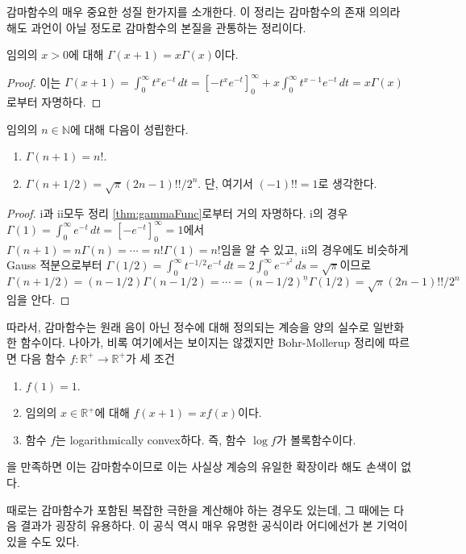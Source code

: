 감마함수의 매우 중요한 성질 한가지를 소개한다. 이 정리는 감마함수의 존재 의의라 해도 과언이 아닐 정도로 감마함수의 본질을 관통하는 정리이다.

\begin{theorem}\label{thm:gammaFunc}
    임의의 $x>0$에 대해 $\Gamma(x+1)=x\Gamma(x)$이다.
\end{theorem}

\begin{proof}
    이는 $\Gamma(x+1)=\int_0^\infty t^xe^{-t}\,dt=[-t^xe^{-t}]_0^\infty+x\int_0^\infty t^{x-1}e^{-t}\,dt=x\Gamma(x)$로부터 자명하다.
\end{proof}

\begin{corollary}
    임의의 $n\in\mathbb{N}$에 대해 다음이 성립한다.
    \begin{enumerate}
        \item $\Gamma(n+1)=n!$.
        \item $\Gamma(n+1/2)=\sqrt{\pi}(2n-1)!!/2^n$. 단, 여기서 $(-1)!!=1$로 생각한다.
    \end{enumerate}
\end{corollary}

\begin{proof}
    i과 ii모두 정리 \ref{thm:gammaFunc}로부터 거의 자명하다. i의 경우 $\Gamma(1)=\int_0^\infty e^{-t}\,dt=[-e^{-t}]_0^\infty=1$에서 $\Gamma(n+1)=n\Gamma(n)=\cdots=n!\Gamma(1)=n!$임을 알 수 있고, ii의 경우에도 비슷하게 Gauss 적분으로부터 $\Gamma(1/2)=\int_0^\infty t^{-1/2}e^{-t}\,dt=2\int_0^\infty e^{-s^2}\,ds=\sqrt{\pi}$이므로 $\Gamma(n+1/2)=(n-1/2)\Gamma(n-1/2)=\cdots=(n-1/2)^{\underline{n}}\Gamma(1/2)=\sqrt{\pi}(2n-1)!!/2^n$임을 안다.
\end{proof}

따라서, 감마함수는 원래 음이 아닌 정수에 대해 정의되는 계승을 양의 실수로 일반화한 함수이다. 나아가, 비록 여기에서는 보이지는 않겠지만 Bohr-Mollerup 정리에 따르면 다음 함수 $f:\mathbb{R}^+\to\mathbb{R}^+$가 세 조건
\begin{enumerate}
    \item $f(1)=1$.
    \item 임의의 $x\in\mathbb{R}^+$에 대해 $f(x+1)=xf(x)$이다.
    \item 함수 $f$는 logarithmically convex하다. 즉, 함수 $\log f$가 볼록함수이다.
\end{enumerate}
을 만족하면 이는 감마함수이므로 이는 사실상 계승의 유일한 확장이라 해도 손색이 없다.

때로는 감마함수가 포함된 복잡한 극한을 계산해야 하는 경우도 있는데, 그 때에는 다음 결과가 굉장히 유용하다. 이 공식 역시 매우 유명한 공식이라 어디에선가 본 기억이 있을 수도 있다.

